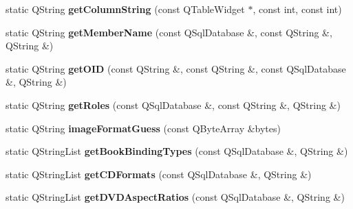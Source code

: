 \begin{DoxyCompactItemize}
\item 
static Q\+String {\bfseries get\+Column\+String} (const Q\+Table\+Widget $\ast$, const int, const int)\hypertarget{classbiblioteq__misc__functions_a83f09305caec8155ba75cc7d034d1a64}{}\label{classbiblioteq__misc__functions_a83f09305caec8155ba75cc7d034d1a64}

\item 
static Q\+String {\bfseries get\+Member\+Name} (const Q\+Sql\+Database \&, const Q\+String \&, Q\+String \&)\hypertarget{classbiblioteq__misc__functions_a3a608bb58cd7c0011d771bce6d98af9c}{}\label{classbiblioteq__misc__functions_a3a608bb58cd7c0011d771bce6d98af9c}

\item 
static Q\+String {\bfseries get\+O\+ID} (const Q\+String \&, const Q\+String \&, const Q\+Sql\+Database \&, Q\+String \&)\hypertarget{classbiblioteq__misc__functions_a7708082314fdfc43fce2006398c15566}{}\label{classbiblioteq__misc__functions_a7708082314fdfc43fce2006398c15566}

\item 
static Q\+String {\bfseries get\+Roles} (const Q\+Sql\+Database \&, const Q\+String \&, Q\+String \&)\hypertarget{classbiblioteq__misc__functions_ad894e4b1aecda279d01ea77bcd1e0c23}{}\label{classbiblioteq__misc__functions_ad894e4b1aecda279d01ea77bcd1e0c23}

\item 
static Q\+String {\bfseries image\+Format\+Guess} (const Q\+Byte\+Array \&bytes)\hypertarget{classbiblioteq__misc__functions_a3891506edc8ee76893031f1209cd0857}{}\label{classbiblioteq__misc__functions_a3891506edc8ee76893031f1209cd0857}

\item 
static Q\+String\+List {\bfseries get\+Book\+Binding\+Types} (const Q\+Sql\+Database \&, Q\+String \&)\hypertarget{classbiblioteq__misc__functions_ab1ba17538f1f9bc3268e4fc4b7e20da1}{}\label{classbiblioteq__misc__functions_ab1ba17538f1f9bc3268e4fc4b7e20da1}

\item 
static Q\+String\+List {\bfseries get\+C\+D\+Formats} (const Q\+Sql\+Database \&, Q\+String \&)\hypertarget{classbiblioteq__misc__functions_a8effb6d65be7c1ce8468c4bccd51b63f}{}\label{classbiblioteq__misc__functions_a8effb6d65be7c1ce8468c4bccd51b63f}

\item 
static Q\+String\+List {\bfseries get\+D\+V\+D\+Aspect\+Ratios} (const Q\+Sql\+Database \&, Q\+String \&)\hypertarget{classbiblioteq__misc__functions_ae5a1c39a119c41619faaa670dfc03c5f}{}\label{classbiblioteq__misc__functions_ae5a1c39a119c41619faaa670dfc03c5f}


\end{DoxyCompactItemize}
